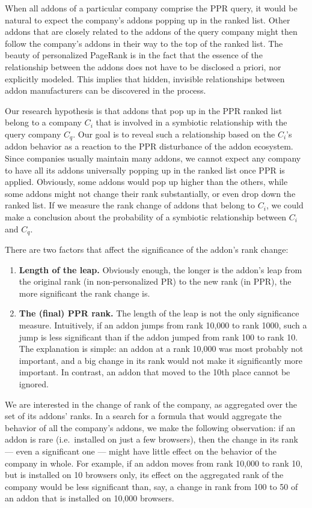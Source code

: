 \documentclass[11pt,oneside]{book}
\begin{document}
When all addons of a particular company comprise the PPR query, it would be natural to expect the company's addons popping up in the ranked list. Other addons that are closely related to the addons of the query company might then follow the company's addons in their way to the top of the ranked list. The beauty of personalized PageRank is in the fact that the essence of the relationship between the addons does not have to be disclosed a priori, nor explicitly modeled. This implies that hidden, invisible relationships between addon manufacturers can be discovered in the process.

Our research hypothesis is that addons that pop up in the PPR ranked list belong to a company $C_i$ that is involved in a symbiotic relationship with the query company $C_q$. Our goal is to reveal such a relationship based on the $C_i$'s addon behavior as a reaction to the PPR disturbance of the addon ecosystem. Since companies usually maintain many addons, we cannot expect any company to have all its addons universally popping up in the ranked list once PPR is applied. Obviously, some addons would pop up higher than the others, while some addons might not change their rank substantially, or even drop down the ranked list. If we measure the rank change of addons that belong to $C_i$, we could make a conclusion about the probability of a symbiotic relationship between $C_i$ and $C_q$.

There are two factors that affect the significance of the addon's rank change:
\begin{enumerate}
\item \textbf{Length of the leap.} Obviously enough, the longer is the addon's leap from the original rank (in non-personalized PR) to the new rank (in PPR), the more significant the rank change is.
\item \textbf{The (final) PPR rank.} The length of the leap is not the only significance measure. Intuitively, if an addon jumps from rank 10,000 to rank 1000, such a jump is less significant than if the addon jumped from rank 100 to rank 10. The explanation is simple: an addon at a rank 10,000 was most probably not important, and a big change in its rank would not make it significantly more important. In contrast, an addon that moved to the 10th place cannot be ignored.
\end{enumerate}

We are interested in the change of rank of the company, as aggregated over the set of its addons' ranks. In a search for a formula that would aggregate the behavior of all the company's addons, we make the following observation: if an addon is rare (i.e.~installed on just a few browsers), then the change in its rank --- even a significant one --- might have little effect on the behavior of the company in whole. For example, if an addon moves from rank 10,000 to rank 10, but is installed on 10 browsers only, its effect on the aggregated rank of the company would be less significant than, say, a change in rank from 100 to 50 of an addon that is installed on 10,000 browsers.
\end{document}
